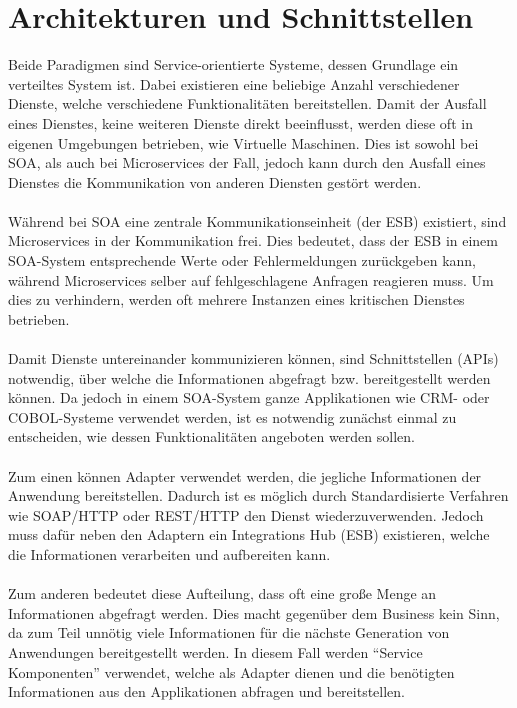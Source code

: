 \section{Architekturen und Schnittstellen}
\label{sec:ArchitekturenUndSchnittstellen}
Beide Paradigmen sind Service-orientierte Systeme, dessen Grundlage ein verteiltes System ist. Dabei existieren eine beliebige Anzahl verschiedener Dienste, welche verschiedene Funktionalitäten bereitstellen. Damit der Ausfall eines Dienstes, keine weiteren Dienste direkt beeinflusst, werden diese oft in eigenen Umgebungen betrieben, wie Virtuelle Maschinen. Dies ist sowohl bei SOA, als auch bei Microservices der Fall, jedoch kann durch den Ausfall eines Dienstes die Kommunikation von anderen Diensten gestört werden.
\\\\
Während bei SOA eine zentrale Kommunikationseinheit (der ESB) existiert, sind Microservices in der Kommunikation frei. Dies bedeutet, dass der ESB in einem SOA-System entsprechende Werte oder Fehlermeldungen zurückgeben kann, während Microservices selber auf fehlgeschlagene Anfragen reagieren muss. Um dies zu verhindern, werden oft mehrere Instanzen eines kritischen Dienstes betrieben.
\\\\
Damit Dienste untereinander kommunizieren können, sind Schnittstellen (APIs) notwendig, über welche die Informationen abgefragt bzw. bereitgestellt werden können. Da jedoch in einem SOA-System ganze Applikationen wie CRM- oder COBOL-Systeme verwendet werden, ist es notwendig zunächst einmal zu entscheiden, wie dessen Funktionalitäten angeboten werden sollen.
\\\\
Zum einen können Adapter verwendet werden, die jegliche Informationen der Anwendung bereitstellen. Dadurch ist es möglich durch Standardisierte Verfahren wie SOAP/HTTP oder REST/HTTP den Dienst wiederzuverwenden. Jedoch muss dafür neben den Adaptern ein Integrations Hub (ESB) existieren, welche die Informationen verarbeiten und aufbereiten kann. 
\\\\
Zum anderen bedeutet diese Aufteilung, dass oft eine große Menge an Informationen abgefragt werden. Dies macht gegenüber dem Business kein Sinn, da zum Teil unnötig viele Informationen für die nächste Generation von Anwendungen bereitgestellt werden. In diesem Fall werden "`Service Komponenten"' verwendet, welche als Adapter dienen und die benötigten Informationen aus den Applikationen abfragen und bereitstellen.
